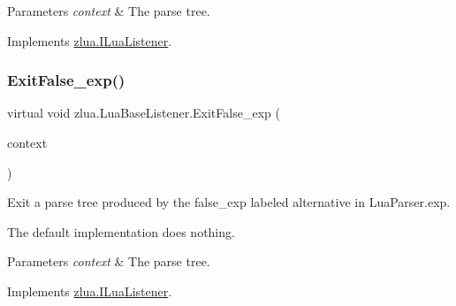 \begin{DoxyParams}{Parameters}
{\em context} & The parse tree.\\
\hline
\end{DoxyParams}


Implements \mbox{\hyperlink{interfacezlua_1_1_i_lua_listener_ad4f41520ee19a409350ab83e01086217}{zlua.\+I\+Lua\+Listener}}.

\mbox{\label{classzlua_1_1_lua_base_listener_a6094ac0c604fce8ffab9ccfcf3023c52}} 
\subsubsection{\texorpdfstring{Exit\+False\+\_\+exp()}{ExitFalse\_exp()}}
{\footnotesize\ttfamily virtual void zlua.\+Lua\+Base\+Listener.\+Exit\+False\+\_\+exp (\begin{DoxyParamCaption}\item[{\mbox{[}\+Not\+Null\mbox{]} \mbox{\hyperlink{classzlua_1_1_lua_parser_1_1_false__exp_context}{Lua\+Parser.\+False\+\_\+exp\+Context}}}]{context }\end{DoxyParamCaption})\hspace{0.3cm}{\ttfamily [virtual]}}



Exit a parse tree produced by the {\ttfamily false\+\_\+exp} labeled alternative in Lua\+Parser.\+exp. 

The default implementation does nothing.


\begin{DoxyParams}{Parameters}
{\em context} & The parse tree.\\
\hline
\end{DoxyParams}


Implements \mbox{\hyperlink{interfacezlua_1_1_i_lua_listener_a78a5b4e244b54f1233447bc8da8f1ac2}{zlua.\+I\+Lua\+Listener}}.

\mbox{\label{classzlua_1_1_lua_base_listener_a2c3ed58a89aca0feaf4e6fc1a74f5f2b}} 

